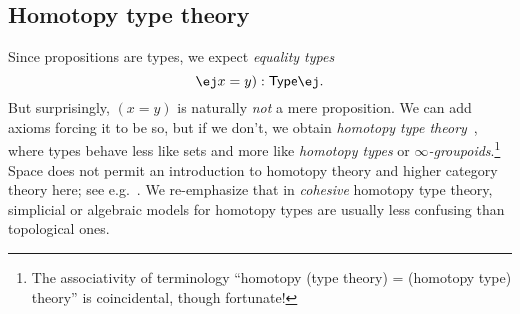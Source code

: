 \documentclass[copyright]{eptcs}
\makeatletter
\newcommand{\type}{\ensuremath{\mathsf{Type}}\xspace}
\def\jd#1{\@jd#1\ej}
\def\@jd#1|-#2\ej{\@@jd#1,,\;\vdash\;\left(#2\right)}
\def\@@jd#1,{\@ifmtarg{#1}{\let\next=\relax}{\left(#1\right)\let\next=\@@@jd}\next}
\def\@@@jd#1,{\@ifmtarg{#1}{\let\next=\relax}{,\,\left(#1\right)\let\next=\@@@jd}\next}
\makeatother
\begin{document}
\subsection{Homotopy type theory}
\label{sec:hott}

Since propositions are types, we expect \emph{equality types}
\[\jd{x:A,y:A|- (x=y):\type}.\]
But surprisingly, $(x=y)$ is naturally \emph{not} a mere proposition. %
We can add axioms forcing it to be so, but if we don't, we obtain \emph{homotopy type theory}~\cite{hottbook}, where types behave less like sets and more like \emph{homotopy types} or \emph{$\infty$-groupoids}.\footnote{The associativity of terminology ``homotopy (type theory) = (homotopy type) theory'' is coincidental, though fortunate!}
Space does not permit an introduction to homotopy theory and higher category theory here; see e.g.~\cite[\S1.1]{LurieHTT}.
We re-emphasize that in \emph{cohesive} homotopy type theory, simplicial or algebraic models for homotopy types are usually less confusing than topological ones.



\end{document}
